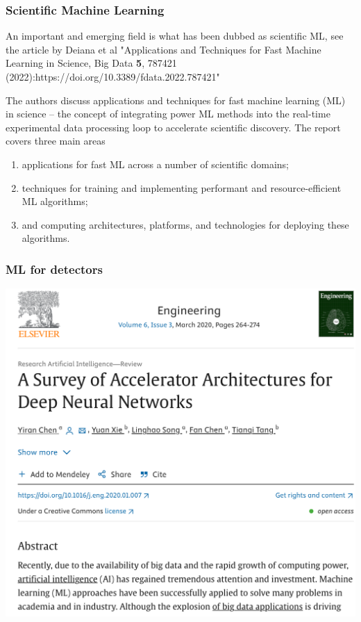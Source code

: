 \documentclass{beamer}
\begin{document}
\begin{frame}
\frametitle{Scientific Machine Learning}

An important and emerging field is what has been dubbed as scientific ML, see the article by Deiana et al "Applications and Techniques for Fast Machine Learning in Science, Big Data \textbf{5}, 787421 (2022):https://doi.org/10.3389/fdata.2022.787421"

\begin{block}{}
The authors discuss applications and techniques for fast machine
learning (ML) in science -- the concept of integrating power ML
methods into the real-time experimental data processing loop to
accelerate scientific discovery. The report covers three main areas

\begin{enumerate}
\item applications for fast ML across a number of scientific domains;

\item techniques for training and implementing performant and resource-efficient ML algorithms;

\item and computing architectures, platforms, and technologies for deploying these algorithms.
\end{enumerate}

\noindent
\end{block}
\end{frame}

\begin{frame}
\frametitle{ML for detectors}

\vspace{6mm}

\centerline{\includegraphics[width=1.0\linewidth]{figures/detectors.png}}

\vspace{6mm}
\end{frame}
\end{document}
